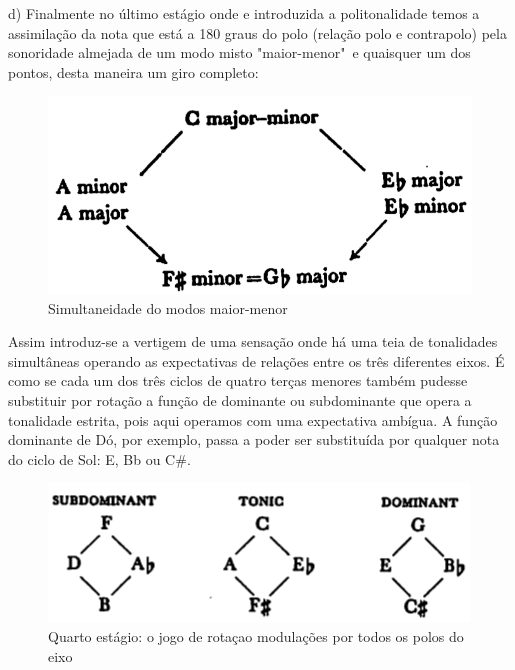 \documentclass[
	12pt,				%
	openright,			%
	twoside,			%
	a4paper,			%
	english,			%
	french,				%
	spanish,			%
	brazil				%
	]{abntex2}
\begin{document}
d) Finalmente no último estágio onde e introduzida a politonalidade temos a assimilação da nota que está a 180 graus do polo (relação polo e contrapolo) pela sonoridade almejada de um modo misto "maior-menor"\ e quaisquer um dos pontos, desta maneira um giro completo:


\begin{figure}[!h]
	\caption{\label{fig_grafico}Simultaneidade do modos maior-menor }
	\begin{center}
	    \includegraphics[scale=0.3]{axis/maiormenor.png}
	\end{center}
\end{figure}



Assim introduz-se a vertigem de uma sensação onde há uma teia de tonalidades simultâneas operando as expectativas de relações entre os três diferentes eixos. É como se cada um dos três ciclos de quatro terças menores também pudesse substituir por rotação a função de dominante ou subdominante que opera a tonalidade estrita, pois aqui operamos com uma expectativa ambígua. A função dominante de Dó, por exemplo, passa a poder ser substituída por qualquer nota do ciclo de Sol: E, Bb ou C\#.

\begin{figure}[!h]
	\caption{\label{fig_grafico}Quarto estágio: o jogo de rotaçao modulações por todos os polos do eixo }
	\begin{center}
	    \includegraphics[scale=0.5]{axis/estagio04.png}
	\end{center}
\end{figure}
\end{document}
